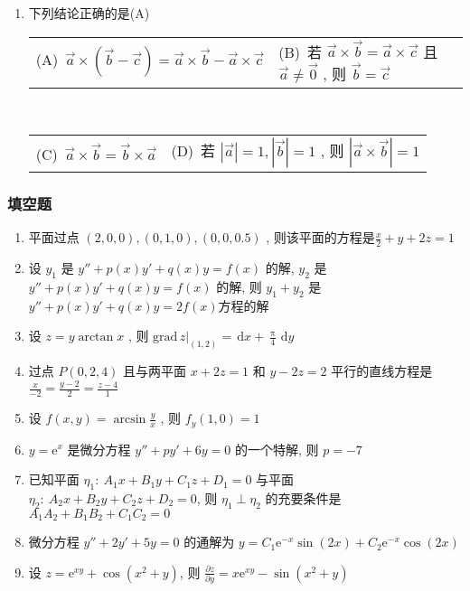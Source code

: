 \documentclass[cn,11pt,fancy,hide]{elegantbook}
\makeatletter
\newcommand{\ee}{\mathrm{e}}
\newcommand{\dd}{\,\mathrm{d}}
\newcommand{\twoch}[4]{\\\begin{tabular}{*{2}{@{}p{7cm}}}(A)~#1 & (B)~#2\end{tabular}\\\begin{tabular}{*{2}{@{}p{7cm}}}(C)~#3 & (D)~#4\end{tabular}}  %
\makeatother
\begin{document}
\begin{enumerate}
	\twoch{$2y\left(1+x^3\right)\ee^{x^2y}$}{$\ee^{x^2y}$}{$2x\left(1+x^2y\right)\ee^{x^2y}$}{$2x\ee^{x^2y}$}
	\item 下列结论正确的是(\hspace{0.25pc}A\hspace{0.25pc})
	\twoch{$\vec{a}\times\left(\vec{b}-\vec{c}\right)=\vec{a}\times\vec{b}-\vec{a}\times\vec{c}$}{若 $\vec{a}\times\vec{b}=\vec{a}\times\vec{c}$ 且 $\vec{a}\ne\vec{0}$ , 则 $\vec{b}=\vec{c}$}{$\vec{a}\times\vec{b}=\vec{b}\times\vec{a}$}{若 $\left|\vec{a}\right|=1,\left|\vec{b}\right|=1$ , 则 $\left|\vec{a}\times\vec{b}\right|=1$}
\end{enumerate}

\subsubsection{填空题}
\begin{enumerate}
	\item 平面过点 $(2,0,0),(0,1,0),(0,0,0.5)$ , 则该平面的方程是\underline{\hspace{1pc}$\frac{x}{2}+y+2z=1$\hspace{1pc}}
	\item 设 $y_1$ 是 $y''+p(x)y'+q(x)y=f(x)$ 的解, $y_2$ 是 $y''+p(x)y'+q(x)y=f(x)$ 的解, 则 $y_1+y_2$ 是\underline{\hspace{1pc}$y''+p(x)y'+q(x)y=2f(x)$\hspace{1pc}}方程的解
	\item 设 $z=y\arctan x$ , 则 $\left.\mathrm{grad}\,z\right|_{(1,2)}=$\underline{\hspace{1pc}$\dd x+\frac{\uppi}{4}\dd y$\hspace{1pc}}
	\item 过点 $P(0,2,4)$ 且与两平面 $x+2z=1$ 和 $y-2z=2$ 平行的直线方程是\underline{\hspace{1pc}$\frac{x}{-2}=\frac{y-2}{2}=\frac{z-4}{1}$\hspace{1pc}}
	\item 设 $f(x,y)=\arcsin\frac{y}{x}$ , 则 $f_y(1,0)=$\underline{\hspace{1pc}$1$\hspace{1pc}}
	\item $y=\ee^x$ 是微分方程 $y''+py'+6y=0$ 的一个特解, 则 $p=$\underline{\hspace{1pc}$-7$\hspace{1pc}}
	\item 已知平面 $\eta_1:\ A_1x+B_1y+C_1z+D_1=0$ 与平面 $\eta_2:\ A_2x+B_2y+C_2z+D_2=0$, 则 $\eta_1\perp\eta_2$ 的充要条件是\underline{\hspace{1pc}$A_1A_2+B_1B_2+C_1C_2=0$\hspace{1pc}}
	\item 微分方程 $y''+2y'+5y=0$ 的通解为 $y=$\underline{\hspace{1pc}$C_1\ee^{-x}\sin(2x)+C_2\ee^{-x}\cos(2x)$\hspace{1pc}}
	\item 设 $z=\ee^{xy}+\cos\left(x^2+y\right)$, 则 $\frac{\partial z}{\partial y}=$\underline{\hspace{1pc}$x\ee^{xy}-\sin\left(x^2+y\right)$\hspace{1pc}}
\end{enumerate}
\end{document}
